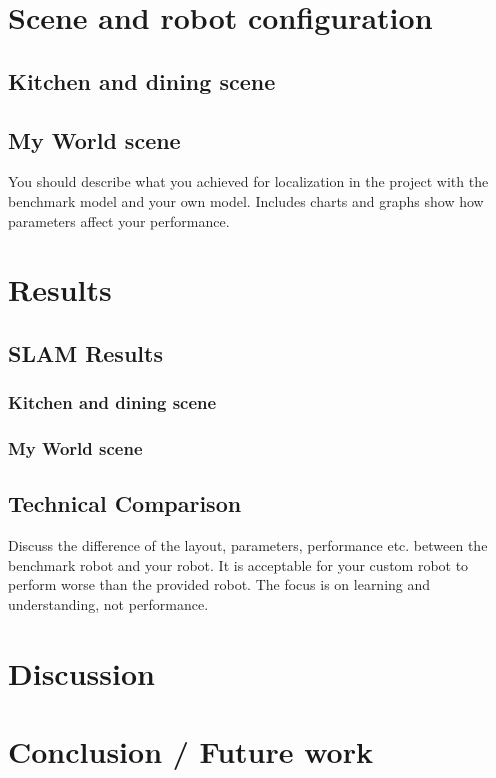 \documentclass[10pt,journal,compsoc]{IEEEtran}
\begin{document}
\section{Scene and robot configuration}
\subsection{Kitchen and dining scene}

\subsection{My World scene}
You should describe what you achieved for localization in the project with the benchmark model and your own model. Includes charts and graphs show how parameters affect your performance. 

\section{Results}

\subsection{SLAM Results}
\subsubsection{Kitchen and dining scene}
\subsubsection{My World scene}

\subsection{Technical Comparison} %
Discuss the difference of the layout, parameters, performance etc. between the benchmark robot and your robot. It is acceptable for your custom robot to perform worse than the provided robot. The focus is on learning and understanding, not performance. 

\section{Discussion}


\section{Conclusion / Future work}
\end{document}

